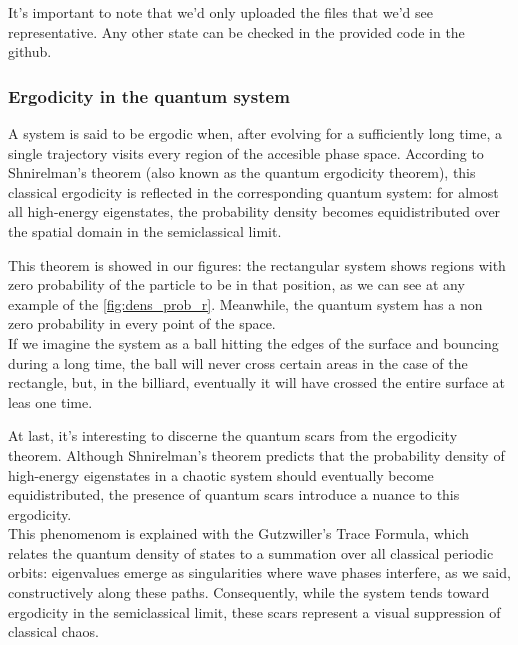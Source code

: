 It's important to note that we'd only uploaded the files that we'd see representative. Any other state can be checked in the provided code in the github. \cite{PCSProject}


\subsubsection{Ergodicity in the quantum system}

A system is said to be ergodic when, after evolving for a sufficiently long time, a single trajectory visits every region of the accesible phase space. According to Shnirelman's theorem (also known as the quantum ergodicity theorem), this classical ergodicity is reflected in the corresponding quantum system: for almost all high-energy eigenstates, the probability density becomes equidistributed over the spatial domain in the semiclassical limit. 

This theorem is showed in our figures: the rectangular system shows regions with zero probability of the particle to be in that position, as we can see at any example of the \autoref{fig:dens_prob_r}. Meanwhile, the quantum system has a non zero probability in every point of the space. \\
If we imagine the system as a ball hitting the edges of the surface and bouncing during a long time, the ball will never cross certain areas in the case of the rectangle, but, in the billiard, eventually it will have crossed the entire surface at leas one time. 

At last, it's interesting to discerne the quantum scars from the ergodicity theorem. Although Shnirelman's theorem predicts that the probability density of high-energy eigenstates in a chaotic system should eventually become equidistributed, the presence of quantum scars introduce a nuance to this ergodicity. \\
This phenomenom is explained with the Gutzwiller's Trace Formula, which relates the quantum density of states to a summation over all classical periodic orbits: eigenvalues emerge as singularities where wave phases interfere, as we said, constructively along these paths. Consequently, while the system tends toward ergodicity in the semiclassical limit, these scars represent a visual suppression of classical chaos. \cite{WikipediaQuantumScar}